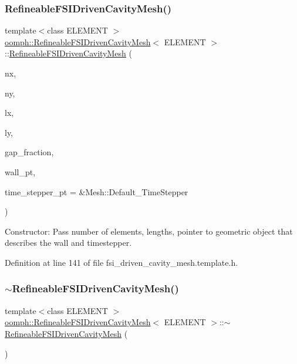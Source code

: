\subsubsection{\texorpdfstring{Refineable\+F\+S\+I\+Driven\+Cavity\+Mesh()}{RefineableFSIDrivenCavityMesh()}}
{\footnotesize\ttfamily template$<$class E\+L\+E\+M\+E\+NT $>$ \\
\hyperlink{classoomph_1_1RefineableFSIDrivenCavityMesh}{oomph\+::\+Refineable\+F\+S\+I\+Driven\+Cavity\+Mesh}$<$ E\+L\+E\+M\+E\+NT $>$\+::\hyperlink{classoomph_1_1RefineableFSIDrivenCavityMesh}{Refineable\+F\+S\+I\+Driven\+Cavity\+Mesh} (\begin{DoxyParamCaption}\item[{const unsigned \&}]{nx,  }\item[{const unsigned \&}]{ny,  }\item[{const double \&}]{lx,  }\item[{const double \&}]{ly,  }\item[{const double \&}]{gap\+\_\+fraction,  }\item[{Geom\+Object $\ast$}]{wall\+\_\+pt,  }\item[{Time\+Stepper $\ast$}]{time\+\_\+stepper\+\_\+pt = {\ttfamily \&Mesh\+:\+:Default\+\_\+TimeStepper} }\end{DoxyParamCaption})\hspace{0.3cm}{\ttfamily [inline]}}



Constructor\+: Pass number of elements, lengths, pointer to geometric object that describes the wall and timestepper. 



Definition at line 141 of file fsi\+\_\+driven\+\_\+cavity\+\_\+mesh.\+template.\+h.

\mbox{\label{classoomph_1_1RefineableFSIDrivenCavityMesh_a01e9f73b3d9344b6df2aeda2c57de628}} 
\subsubsection{\texorpdfstring{$\sim$\+Refineable\+F\+S\+I\+Driven\+Cavity\+Mesh()}{~RefineableFSIDrivenCavityMesh()}}
{\footnotesize\ttfamily template$<$class E\+L\+E\+M\+E\+NT $>$ \\
\hyperlink{classoomph_1_1RefineableFSIDrivenCavityMesh}{oomph\+::\+Refineable\+F\+S\+I\+Driven\+Cavity\+Mesh}$<$ E\+L\+E\+M\+E\+NT $>$\+::$\sim$\hyperlink{classoomph_1_1RefineableFSIDrivenCavityMesh}{Refineable\+F\+S\+I\+Driven\+Cavity\+Mesh} (\begin{DoxyParamCaption}{ }\end{DoxyParamCaption})\hspace{0.3cm}{\ttfamily [inline]}}



